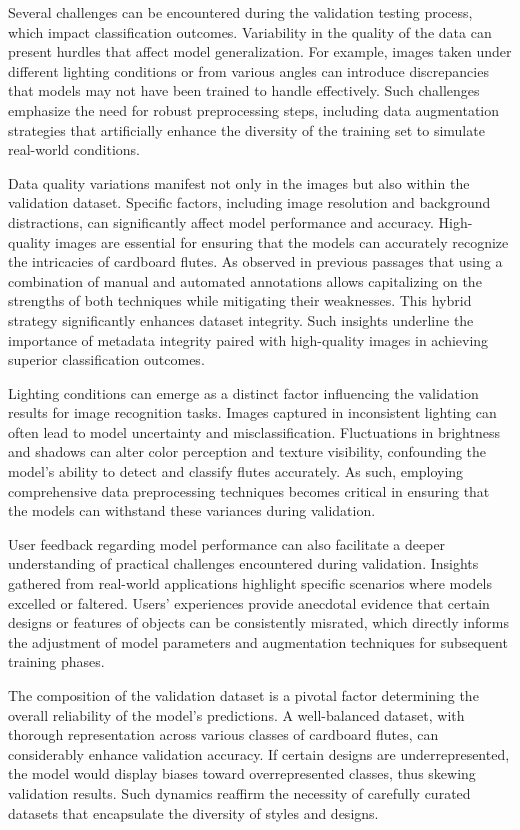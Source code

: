 Several challenges can be encountered during the validation testing process, which impact classification outcomes. Variability in the quality of the data can present hurdles that affect model generalization. For example, images taken under different lighting conditions or from various angles can introduce discrepancies that models may not have been trained to handle effectively. Such challenges emphasize the need for robust preprocessing steps, including data augmentation strategies that artificially enhance the diversity of the training set to simulate real-world conditions.


Data quality variations manifest not only in the images but also within the validation dataset. Specific factors, including image resolution and background distractions, can significantly affect model performance and accuracy. High-quality images are essential for ensuring that the models can accurately recognize the intricacies of cardboard flutes. As observed in previous passages that using a combination of manual and automated annotations allows capitalizing on the strengths of both techniques while mitigating their weaknesses. This hybrid strategy significantly enhances dataset integrity. Such insights underline the importance of metadata integrity paired with high-quality images in achieving superior classification outcomes.



Lighting conditions can emerge as a distinct factor influencing the validation results for image recognition tasks. Images captured in inconsistent lighting can often lead to model uncertainty and misclassification. Fluctuations in brightness and shadows can alter color perception and texture visibility, confounding the model's ability to detect and classify flutes accurately. As such, employing comprehensive data preprocessing techniques becomes critical in ensuring that the models can withstand these variances during validation.



User feedback regarding model performance can also facilitate a deeper understanding of practical challenges encountered during validation. Insights gathered from real-world applications highlight specific scenarios where models excelled or faltered. Users' experiences provide anecdotal evidence that certain designs or features of objects can be consistently misrated, which directly informs the adjustment of model parameters and augmentation techniques for subsequent training phases.


The composition of the validation dataset is a pivotal factor determining the overall reliability of the model's predictions. A well-balanced dataset, with thorough representation across various classes of cardboard flutes, can considerably enhance validation accuracy. If certain designs are underrepresented, the model would display biases toward overrepresented classes, thus skewing validation results. Such dynamics reaffirm the necessity of carefully curated datasets that encapsulate the diversity of styles and designs.


